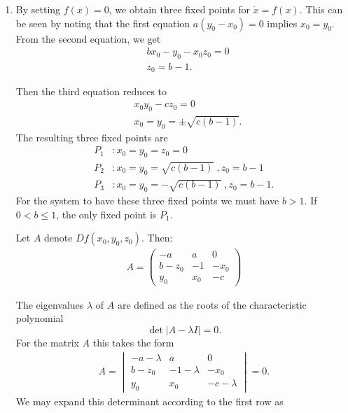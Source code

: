 \begin{solution}[3.3]
	\leavevmode
\begin{enumerate}
\item By setting $f(x)=0$, we obtain three fixed points for $\dot{x} = f(x)$. This can be seen by noting that the first equation $a(y_0 - x_0)=0$ implies $x_0 = y_0$. From the second equation, we get
\begin{align}
        &bx_0 - y_0 -x_0 z_0 = 0 \\
	&z_0 = b-1.
\end{align}

Then the third equation reduces to
\begin{align}
        &x_0y_0 - cz_0 = 0\\
        	&x_0=y_0 = \pm \sqrt{c(b-1)}.
\end{align}
The resulting three fixed points are
\begin{align}
	P_1 &: x_0 = y_0 = z_0 = 0\\
	P_2 &: x_0 = y_0 = \sqrt{c(b-1)} \;, z_0 = b-1 \\
	P_3 &: x_0 = y_0 = -\sqrt{c(b-1)} \;, z_0 = b-1.
\end{align}
For the system to have these three fixed points we must have $\boxed{b>1}$. If $0<b\leq1$, the only fixed point is $P_1$.

Let $A$ denote $Df(x_0,y_0,z_0)$. Then:
\begin{align}
	A = \begin{pmatrix}
		-a & a & 0 \\
		b-z_0 & -1 & -x_0 \\
		y_0 & x_0 & -c
	\end{pmatrix}
\end{align}

The eigenvalues $\lambda$ of $A$ are defined as the roots of the characteristic polynomial
$$
\det |A - \lambda I |=0.
$$
For the matrix $A$ this takes the form
\begin{align}
	A = \begin{vmatrix}
		-a-\lambda & a & 0 \\
		b-z_0 & -1-\lambda & -x_0 \\
		y_0 & x_0 & -c-\lambda
	\end{vmatrix} = 0.
\end{align}
We may expand this determinant according to the first row as


\end{enumerate}
\end{solution}
